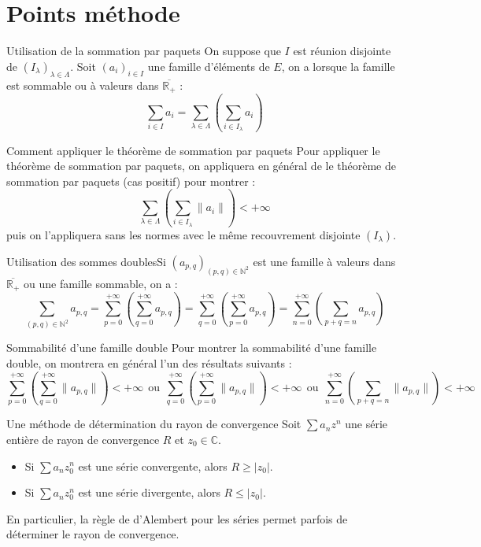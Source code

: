 \documentclass[french]{book}
\newcommand{\N}{\mathbb{N}}
\newcommand{\R}{\mathbb{R}}
\newcommand{\C}{\mathbb{C}}
\theoremstyle{plain}
\theoremstyle{definition}
\theoremstyle{remark}
\begin{document}
\section{Points méthode}
\begin{PM}{Utilisation de la sommation par paquets} On suppose que $I$ est réunion disjointe de $(I_\lambda)_{\lambda\in\Lambda}$. Soit $(a_i)_{i\in I}$ une famille d'éléments de $E$, on a lorsque la famille est sommable ou à valeurs dans $\overline{\R_+}$ : $$\sum_{i\in I}a_i=\sum_{\lambda\in\Lambda}\left(\sum_{i\in I_\lambda}a_i\right)$$
\end{PM}
\begin{PM}{Comment appliquer le théorème de sommation par paquets} Pour appliquer le théorème de sommation par paquets, on appliquera en général de le théorème de sommation par paquets (cas positif) pour montrer : $$\sum_{\lambda\in\Lambda}\left(\sum_{i\in I_\lambda}\lVert a_i\rVert\right)<+\infty$$ puis on l'appliquera sans les normes avec le même recouvrement disjointe $(I_\lambda)$.
\end{PM}
\begin{PM}{Utilisation des sommes doubles}Si $(a_{p,q})_{(p,q)\in\N^2}$ est une famille à valeurs dans $\overline{\R_+}$ ou une famille sommable, on a : $$\sum_{(p,q)\in\N^2}a_{p,q}=\sum_{p=0}^{+\infty}\left(\sum_{q=0}^{+\infty}a_{p,q}\right)=\sum_{q=0}^{+\infty}\left(\sum_{p=0}^{+\infty}a_{p,q}\right)=\sum_{n=0}^{+\infty}\left(\sum_{p+q=n}a_{p,q}\right)$$
\end{PM}
\begin{PM}{Sommabilité d'une famille double} Pour montrer la sommabilité d'une famille double, on montrera en général l'un des résultats suivants : $$\sum_{p=0}^{+\infty}\left(\sum_{q=0}^{+\infty}\lVert a_{p,q}\rVert\right)<+\infty \ \ \text{ou} \ \ \sum_{q=0}^{+\infty}\left(\sum_{p=0}^{+\infty}\lVert a_{p,q}\rVert\right)<+\infty \ \ \text{ou} \ \ \sum_{n=0}^{+\infty}\left(\sum_{p+q=n}\lVert a_{p,q}\rVert\right)<+\infty$$
\end{PM}
\begin{PM}{Une méthode de détermination du rayon de convergence} Soit $\displaystyle\sum a_nz^n$ une série entière de rayon de convergence $R$ et $z_0\in\C$.
\begin{itemize}
	\item Si $\displaystyle\sum a_nz_0^n$ est une série convergente, alors $R\geqslant\lvert z_0\rvert$.
	\item Si $\displaystyle\sum a_nz_0^n$ est une série divergente, alors $R\leqslant\lvert z_0\rvert$.
\end{itemize}
En particulier, la règle de d'Alembert pour les séries permet parfois de déterminer le rayon de convergence.
\end{PM}
\end{document}
